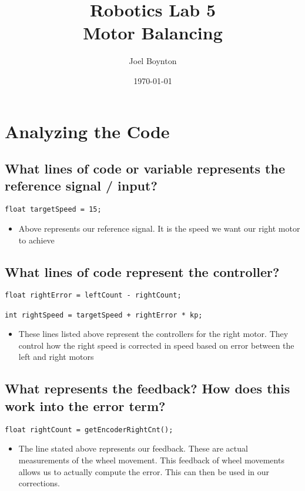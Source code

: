 \documentclass[11pt]{article}
\author{Joel Boynton}
\date{\today}
\title{Robotics Lab 5\\\medskip
\large Motor Balancing}
\begin{document}
\maketitle
\clearpage
\section{Analyzing the Code}
\label{sec:orge24ced6}

\subsection{What lines of code or variable represents the reference signal / input?}
\label{sec:orgb8e4a24}
\begin{verbatim}
float targetSpeed = 15;
\end{verbatim}
\begin{itemize}
\item Above  represents our reference signal. It is the speed we want our right motor to achieve
\end{itemize}
\subsection{What lines of code represent the controller?}
\label{sec:org656549a}
\begin{verbatim}
float rightError = leftCount - rightCount;

int rightSpeed = targetSpeed + rightError * kp;
\end{verbatim}
\begin{itemize}
\item These lines listed above represent the controllers for the right motor. They control how the right speed is corrected in speed based on error between the left and right motors
\end{itemize}
\subsection{What represents the feedback? How does this work into the error term?}
\label{sec:orgad3218b}
\begin{verbatim}
float rightCount = getEncoderRightCnt();
\end{verbatim}
\begin{itemize}
\item The line stated above represents our feedback. These are actual measurements of the wheel movement. This feedback of wheel movements allows us to actually compute the error. This can then be used in our corrections.
\end{itemize}
\end{document}
